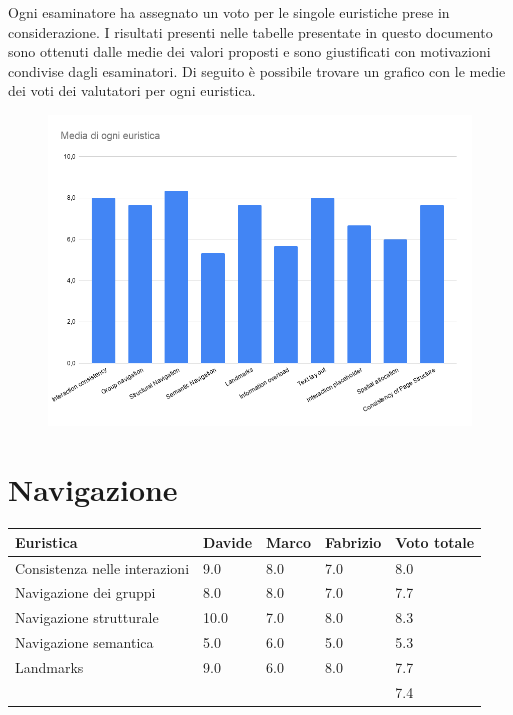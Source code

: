    Ogni esaminatore ha assegnato un voto per le singole euristiche prese in
    considerazione. I risultati presenti nelle tabelle presentate in questo
    documento sono ottenuti dalle medie dei valori proposti e sono giustificati
    con motivazioni condivise dagli esaminatori. Di seguito è possibile trovare un grafico 
    con le medie dei voti dei valutatori per ogni euristica.
    \begin{figure}[H]
        \centering
        \includegraphics[scale=0.3]{resources/images/graficoMedieEuristiche.png}
    \end{figure}
    \section{Navigazione}
        \begin{table}[H]
        \begin{tabular}{|l|l|l|l|l|}
            \hline \textbf{Euristica} & \textbf{Davide} & \textbf{Marco} &
            \textbf{Fabrizio} & \textbf{Voto totale} \\ \hline
            Consistenza nelle interazioni           & 9.0   & 8.0   & 7.0   & 8.0 \\ \hline
            Navigazione dei gruppi                  & 8.0   & 8.0   & 7.0   & 7.7 \\ \hline
            Navigazione strutturale                 & 10.0  & 7.0   & 8.0   & 8.3 \\ \hline
            Navigazione semantica                   & 5.0   & 6.0   & 5.0   & 5.3 \\ \hline
            Landmarks                               & 9.0   & 6.0   & 8.0   & 7.7 \\ \hline
                                                    &       &       &       & 7.4 \\ \hline
            \end{tabular}
        \end{table}

